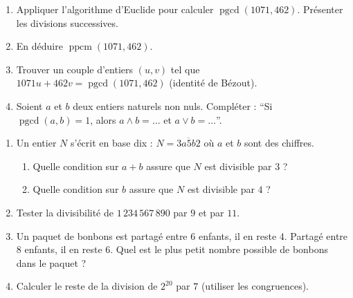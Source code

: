 \documentclass[11pt]{article}
\begin{document}
\begin{exercice}
\begin{enumerate}
    \item Appliquer l'algorithme d'Euclide pour calculer $\operatorname{pgcd}(1071, 462)$. Présenter les divisions successives.
    \item En déduire $\operatorname{ppcm}(1071, 462)$.
    \item Trouver un couple d'entiers $(u, v)$ tel que $1071u + 462v = \operatorname{pgcd}(1071, 462)$ (identité de Bézout).
    \item Soient $a$ et $b$ deux entiers naturels non nuls. Compléter : ``Si $\operatorname{pgcd}(a,b)=1$, alors $a \wedge b = \dots$ et $a \vee b = \dots$''.
\end{enumerate}
\end{exercice}

\begin{exercice}
\begin{enumerate}
    \item Un entier $N$ s'écrit en base dix : $N = \overline{3a5b2}$ où $a$ et $b$ sont des chiffres.
    \begin{enumerate}
        \item Quelle condition sur $a+b$ assure que $N$ est divisible par $3$ ?
        \item Quelle condition sur $b$ assure que $N$ est divisible par $4$ ?
    \end{enumerate}
    \item Tester la divisibilité de $1\,234\,567\,890$ par $9$ et par $11$.
    \item Un paquet de bonbons est partagé entre $6$ enfants, il en reste $4$. Partagé entre $8$ enfants, il en reste $6$. Quel est le plus petit nombre possible de bonbons dans le paquet ?
    \item Calculer le reste de la division de $2^{20}$ par $7$ (utiliser les congruences).
\end{enumerate}
\end{exercice}
\end{document}
